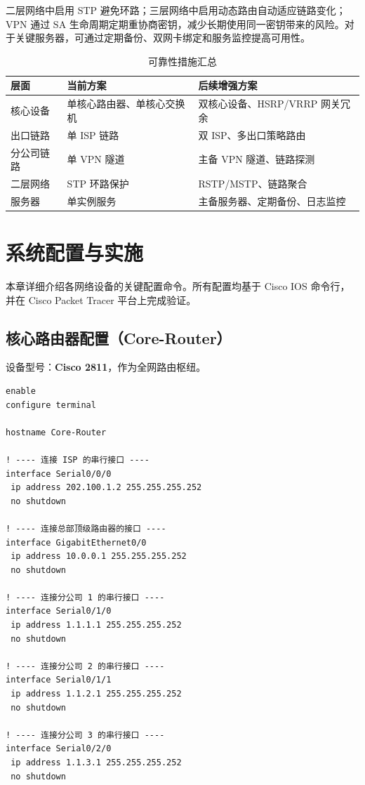 \documentclass[12pt,a4paper]{ctexart}
\begin{document}
二层网络中启用 STP 避免环路；三层网络中启用动态路由自动适应链路变化；VPN 通过 SA 生命周期定期重协商密钥，减少长期使用同一密钥带来的风险。对于关键服务器，可通过定期备份、双网卡绑定和服务监控提高可用性。

\begin{table}[H]
\centering
\caption{可靠性措施汇总}
\label{tab:reliability}
\begin{tabular}{|p{3cm}|p{5cm}|p{5cm}|}
\hline
\textbf{层面} & \textbf{当前方案} & \textbf{后续增强方案} \\ \hline
核心设备 & 单核心路由器、单核心交换机 & 双核心设备、HSRP/VRRP 网关冗余 \\ \hline
出口链路 & 单 ISP 链路 & 双 ISP、多出口策略路由 \\ \hline
分公司链路 & 单 VPN 隧道 & 主备 VPN 隧道、链路探测 \\ \hline
二层网络 & STP 环路保护 & RSTP/MSTP、链路聚合 \\ \hline
服务器 & 单实例服务 & 主备服务器、定期备份、日志监控 \\ \hline
\end{tabular}
\end{table}

\section{系统配置与实施}

本章详细介绍各网络设备的关键配置命令。所有配置均基于 Cisco IOS 命令行，并在 Cisco Packet Tracer 平台上完成验证。

\subsection{核心路由器配置（Core-Router）}

设备型号：\textbf{Cisco 2811}，作为全网路由枢纽。

\begin{lstlisting}[caption={核心路由器基础配置}, label={lst:core-router}]
enable
configure terminal

hostname Core-Router

! ---- 连接 ISP 的串行接口 ----
interface Serial0/0/0
 ip address 202.100.1.2 255.255.255.252
 no shutdown

! ---- 连接总部顶级路由器的接口 ----
interface GigabitEthernet0/0
 ip address 10.0.0.1 255.255.255.252
 no shutdown

! ---- 连接分公司 1 的串行接口 ----
interface Serial0/1/0
 ip address 1.1.1.1 255.255.255.252
 no shutdown

! ---- 连接分公司 2 的串行接口 ----
interface Serial0/1/1
 ip address 1.1.2.1 255.255.255.252
 no shutdown

! ---- 连接分公司 3 的串行接口 ----
interface Serial0/2/0
 ip address 1.1.3.1 255.255.255.252
 no shutdown
\end{lstlisting}
\end{document}
